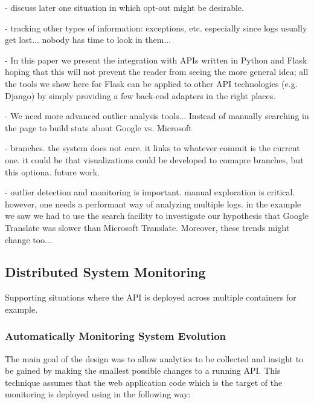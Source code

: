 - discuss later one situation in which opt-out might be desirable. 

- tracking other types of information: exceptions, etc. especially since logs usually get lost... nobody has time to look in them...

-  In this paper we present the integration with APIs written in Python and Flask hoping that this will not prevent the reader from seeing the more general idea; all the tools we show here for Flask can be applied to other API technologies (e.g. Django) by simply providing a few back-end adapters in the right places.

- We need more advanced outlier analysis tools... Instead of manually searching in the page to build stats about Google vs. Microsoft

- branches. the system does not care. it links to whatever commit is the current one. it could be that visualizations could be developed to comapre branches, but this optiona. future work. 

- outlier detection and monitoring is important. manual exploration is critical. however, one needs a performant way of analyzing multiple logs. in the example we saw we had to use the search facility to investigate our hypothesis that Google Translate was slower than Microsoft Translate. Moreover, these trends might change too... 





  \subsection{Distributed System Monitoring}
  Supporting situations where the API is deployed across multiple containers for example.


  \subsubsection{Automatically Monitoring System Evolution}

  The main goal of the \tool design was to allow analytics to be collected and insight to be gained by making the smallest possible changes to a running API. %
%
  This technique assumes that the web application code which is the target of the monitoring is deployed using \git in the following way: 

